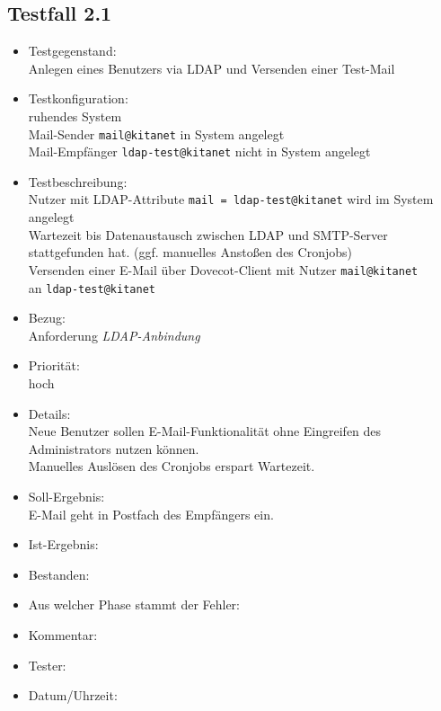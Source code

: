 \subsection{Testfall 2.1}
\begin{itemize}
	\item Testgegenstand:\\
	Anlegen eines Benutzers via LDAP und Versenden einer Test-Mail
	\item Testkonfiguration:\\
	ruhendes System\\
	Mail-Sender \verb+mail@kitanet+ in System angelegt\\
	Mail-Empfänger \verb+ldap-test@kitanet+ nicht in System angelegt
	\item Testbeschreibung:\\
	Nutzer mit LDAP-Attribute \verb+mail = ldap-test@kitanet+ wird im System angelegt\\
	Wartezeit bis Datenaustausch zwischen LDAP und SMTP-Server stattgefunden hat. (ggf. manuelles Anstoßen des Cronjobs)\\
	Versenden einer E-Mail über Dovecot-Client mit Nutzer \verb+mail@kitanet+ \\ an \verb+ldap-test@kitanet+
	\item Bezug:\\
	Anforderung \textit{LDAP-Anbindung}
	\item Priorität:\\
	hoch
	\item Details:\\
	Neue Benutzer sollen E-Mail-Funktionalität ohne Eingreifen des Administrators nutzen können.\\
	Manuelles Auslösen des Cronjobs erspart Wartezeit.
	\item Soll-Ergebnis:\\
	E-Mail geht in Postfach des Empfängers ein.
	\item Ist-Ergebnis:\\
	\item Bestanden:\\
	\item Aus welcher Phase stammt der Fehler:\\
	\item Kommentar:\\
	\item Tester:\\
	\item Datum/Uhrzeit:\\
\end{itemize}

